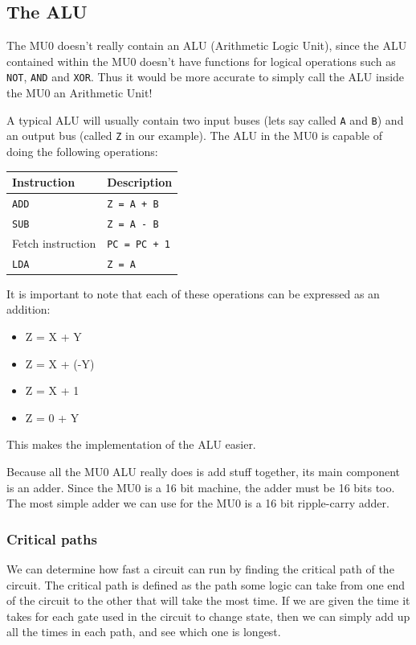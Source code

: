 \documentclass{article}
\begin{document}
\subsection{The ALU}

The MU0 doesn't really contain an ALU (Arithmetic Logic Unit), since the ALU
contained within the MU0 doesn't have functions for logical operations such as
{\tt NOT}, {\tt AND} and {\tt XOR}. Thus it would be more accurate to simply
call the ALU inside the MU0 an Arithmetic Unit!

A typical ALU will usually contain two input buses (lets say called {\tt A} and
{\tt B}) and an output bus (called {\tt Z} in our example). The ALU in the MU0 is
capable of doing the following operations:

\begin{center}
	\begin{tabular}{|l|l|}
		\hline
		{\bf Instruction} & {\bf Description}\\ \hline
		{\tt ADD} & {\tt Z = A + B}\\ \hline
		{\tt SUB} & {\tt Z = A - B}\\ \hline
		Fetch instruction & {\tt PC = PC + 1}\\ \hline
		{\tt LDA} & {\tt Z = A}\\ \hline
	\end{tabular}
\end{center}

It is important to note that each of these operations can be expressed as an
addition:

\begin{itemize}
	\item Z = X + Y
	\item Z = X + (-Y)
	\item Z = X + 1
	\item Z = 0 + Y
\end{itemize}

This makes the implementation of the ALU easier.

Because all the MU0 ALU really does is add stuff together, its main component is
an adder. Since the MU0 is a 16 bit machine, the adder must be 16 bits too. The
most simple adder we can use for the MU0 is a 16 bit ripple-carry adder.

\subsubsection{Critical paths}

We can determine how fast a circuit can run by finding the critical path of the
circuit. The critical path is defined as the path some logic can take from one
end of the circuit to the other that will take the most time. If we are given
the time it takes for each gate used in the circuit to change state, then we can
simply add up all the times in each path, and see which one is longest.
\end{document}
